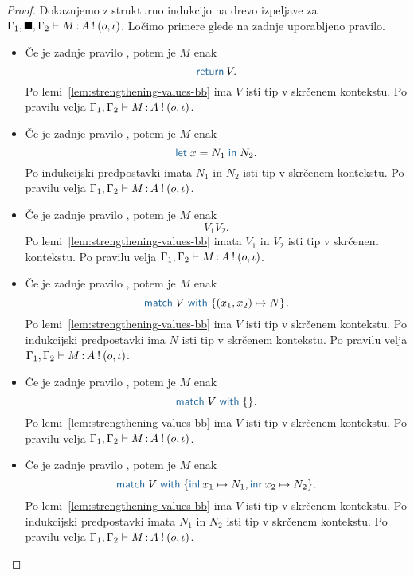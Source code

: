 \begin{proof}
	Dokazujemo z strukturno indukcijo na drevo izpeljave za $\Gamma_1, \blacksquare, \Gamma_2 \vdash M \mathinner{:} A \mathbin{!} (o, \iota)$.
	Ločimo primere glede na zadnje uporabljeno pravilo.
	
	\begin{itemize}
		\item Če je zadnje pravilo , potem je $M$ enak $$\tmreturn{V}.$$
		Po lemi~\ref{lem:strengthening-values-bb} ima $V$ isti tip v skrčenem kontekstu.
		Po pravilu  velja $\Gamma_1, \Gamma_2 \vdash M \mathinner{:} A \mathbin{!} (o, \iota)$.
		
		\item Če je zadnje pravilo , potem je $M$ enak $$\tmlet{x}{N_1}{N_2}.$$
		Po indukcijski predpostavki imata $N_1$ in $N_2$ isti tip v skrčenem kontekstu.
		Po pravilu  velja $\Gamma_1, \Gamma_2 \vdash M \mathinner{:} A \mathbin{!} (o, \iota)$.
		
		\item Če je zadnje pravilo , potem je $M$ enak $$V_1 V_2.$$
		Po lemi~\ref{lem:strengthening-values-bb} imata $V_1$ in $V_2$ isti tip v skrčenem kontekstu.
		Po pravilu  velja $\Gamma_1, \Gamma_2 \vdash M \mathinner{:} A \mathbin{!} (o, \iota)$.
		
		\item Če je zadnje pravilo , potem je $M$ enak $$\tmmatch{V}{(x_1,x_2) \mapsto N}.$$ 
		Po lemi~\ref{lem:strengthening-values-bb} ima $V$ isti tip v skrčenem kontekstu.
		Po indukcijski predpostavki ima $N$ isti tip v skrčenem kontekstu.
		Po pravilu  velja $\Gamma_1, \Gamma_2 \vdash M \mathinner{:} A \mathbin{!} (o, \iota)$.
		
		\item Če je zadnje pravilo , potem je $M$ enak $$\tmmatch{V}{}.$$
		Po lemi~\ref{lem:strengthening-values-bb} ima $V$ isti tip v skrčenem kontekstu.
		Po pravilu  velja $\Gamma_1, \Gamma_2 \vdash M \mathinner{:} A \mathbin{!} (o, \iota)$.
		
		\item Če je zadnje pravilo , potem je $M$ enak $$\tmmatch{V}{\tminl{x_1} \mapsto N_1, \tminr{x_2} \mapsto N_2}.$$
		Po lemi~\ref{lem:strengthening-values-bb} ima $V$ isti tip v skrčenem kontekstu.
		Po indukcijski predpostavki imata $N_1$ in $N_2$ isti tip v skrčenem kontekstu.
		Po pravilu  velja $\Gamma_1, \Gamma_2 \vdash M \mathinner{:} A \mathbin{!} (o, \iota)$.
		

\end{itemize}
\end{proof}
